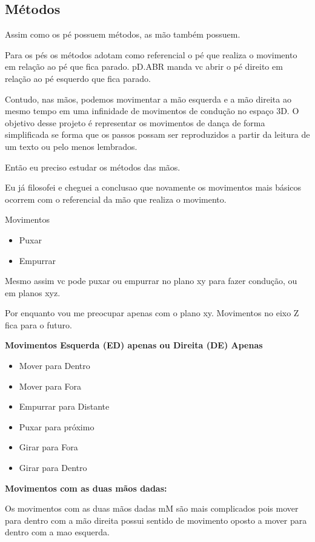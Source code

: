 \subsection{Métodos}

Assim como os pé possuem métodos, as mão também possuem. 


Para os pés os métodos adotam como referencial o pé que realiza o movimento em relação ao pé que fica parado.
pD.ABR manda vc abrir o pé direito em relação ao pé esquerdo que fica parado. 

Contudo, nas mãos, podemos movimentar a mão esquerda e a mão direita ao mesmo tempo em uma infinidade de movimentos de condução no espaço 3D.
O objetivo desse projeto é representar os movimentos de dança de forma simplificada se forma que os passos possam ser reproduzidos a partir
da leitura de um texto ou pelo menos lembrados.

Então eu preciso estudar os métodos das mãos.

Eu já filosofei e cheguei a conclusao que novamente os movimentos mais básicos ocorrem com o referencial da mão que 
realiza o movimento.

Movimentos

\begin{itemize}
	\item Puxar
	\item Empurrar
\end{itemize}

Mesmo assim vc pode puxar ou empurrar no plano xy para fazer condução, ou em planos xyz.

Por enquanto vou me preocupar apenas com o plano xy. Movimentos no eixo Z fica para o futuro.



\textbf{Movimentos Esquerda (ED) apenas ou Direita (DE) Apenas}

\begin{itemize}
	\item Mover para Dentro
	\item Mover para Fora
	\item Empurrar para Distante
	\item Puxar para próximo
	\item Girar para Fora 
	\item Girar para Dentro
\end{itemize}



\textbf{Movimentos com as duas mãos dadas:}

Os movimentos com as duas mãos dadas mM são mais complicados pois mover para dentro com a mão direita possui sentido de movimento
oposto a mover para dentro com a mao esquerda. 

